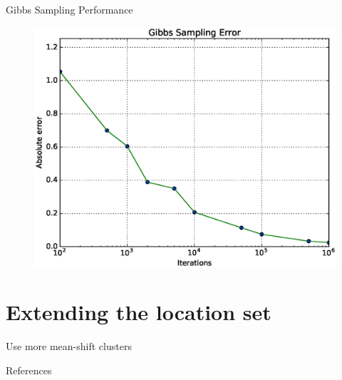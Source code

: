 \documentclass{beamer}
\begin{document}
\begin{frame}{Gibbs Sampling Performance}
  \begin{figure}
    \centering
    \includegraphics[height=0.8\textheight]{gibbs_performance}
  \end{figure}
\end{frame}

\section{Extending the location set}

\begin{frame}{Use more mean-shift clusters}
  
\end{frame}

\begin{frame}{References}
  
  
\end{frame}
\end{document}

